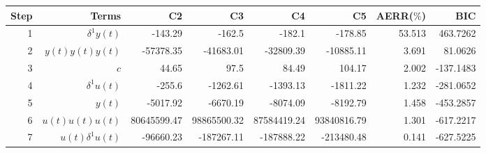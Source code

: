\begin{tabular}{rrrrrrrr}
Step & Terms & C2 & C3 & C4 & C5 & AERR($\%$) & BIC \\ 
\hline 
1 & $\delta^1 y(t)$ & -143.29 & -162.5 & -182.1 & -178.85 & 53.513 & 463.7262 \\ 
2 & $y(t)y(t)y(t)$ & -57378.35 & -41683.01 & -32809.39 & -10885.11 & 3.691 & 81.0626 \\ 
3 & $c$ & 44.65 & 97.5 & 84.49 & 104.17 & 2.002 & -137.1483 \\ 
4 & $\delta^1 u(t)$ & -255.6 & -1262.61 & -1393.13 & -1811.22 & 1.232 & -281.0652 \\ 
5 & $y(t)$ & -5017.92 & -6670.19 & -8074.09 & -8192.79 & 1.458 & -453.2857 \\ 
6 & $u(t)u(t)u(t)$ & 80645599.47 & 98865500.32 & 87584419.24 & 93840816.79 & 1.301 & -617.2217 \\ 
7 & $u(t)\delta^1 u(t)$ & -96660.23 & -187267.11 & -187888.22 & -213480.48 & 0.141 & -627.5225 \\ 
\hline 
\end{tabular}